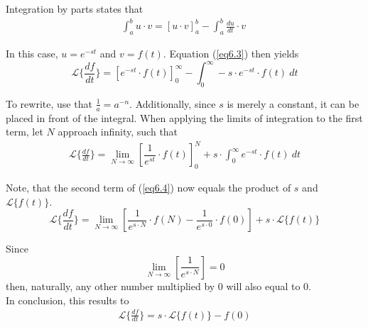\begin{tcolorbox}[colback=gray!5!white,colframe=gray!!black,title=Proof 6.1]
Integration by parts states that 
\begin{align}
\int_{a}^{b}{u\cdot v}=\left[u\cdot v\right]_{a}^{b}-\int_{a}^{b} \frac{du}{dt}\cdot v\
\label{eq6.3}
\end{align}

In this case, $u=e^{-st}$ and $v=f(t)$.
Equation (\ref{eq6.3}) then yields
$$\mathcal{L}\{\frac{df}{dt}\}=\left[e^{-st}\cdot f(t)\right]_{0}^{\infty}-\int_{0}^{\infty} -s\cdot e^{-st}\cdot f(t)\ dt$$

To rewrite, use that $\frac{1}{a}=a^{-n}$. Additionally, since $s$ is merely a constant, it can be placed in front of the integral. When applying the limits of integration to the first term, let $N$ approach infinity, such that
\begin{align}
\mathcal{L}\{\frac{df}{dt}\}=\lim_{N \to \infty}\left[\dfrac{1}{e^{st}}\cdot f(t)\right]_{0}^{N}+s\cdot \int_{0}^{\infty}e^{-st}\cdot f(t)\ dt
\label{eq6.4}
\end{align}

Note, that the second term of (\ref{eq6.4}) now equals the product of $s$ and $\mathcal{L}\{f(t)\}$. 
$$\mathcal{L}\{\frac{df}{dt}\} = \lim_{N \to \infty}\left[\dfrac{1}{e^{s\cdot N}}\cdot f(N)-\dfrac{1}{e^{s\cdot 0}}\cdot f(0)\right]+s\cdot \mathcal{L}\{f(t)\}$$

Since $$\lim_{N \to \infty}\left[\dfrac{1}{e^{s\cdot N}}\right]=0$$ then, naturally, any other number multiplied by 0 will also equal to 0.\\
In conclusion, this results to
\begin{align*}
\mathcal{L}\{\frac{df}{dt}\} = s\cdot \mathcal{L}\{f(t)\}-f(0)
\end{align*}
\end{tcolorbox}